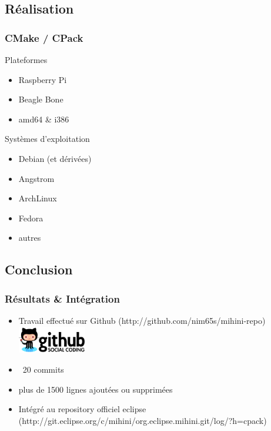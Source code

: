 \documentclass[slidetop,11pt]{beamer}
\begin{document}
\subsection{Réalisation} %
\begin{frame}
    \frametitle{CMake / CPack}
    \begin{block}{Plateformes}
        \begin{itemize}
            \item Raspberry Pi
            \item Beagle Bone
            \item amd64 \& i386
        \end{itemize}
    \end{block}
    \begin{block}{Systèmes d’exploitation}
        \begin{itemize}
            \item Debian (et dérivées)
            \item Angstrom
            \item ArchLinux
            \item Fedora
            \item autres
        \end{itemize}
    \end{block}
\end{frame}


\subsection{Conclusion} %
\begin{frame}
    \frametitle{Résultats \& Intégration}
    \begin{itemize}
        \item Travail effectué sur Github (http://github.com/nim65s/mihini-repo)
            \includegraphics[width=3cm]{img/github.png}
        \item ~20 commits
        \item plus de 1500 lignes ajoutées ou supprimées
        \item Intégré au repository officiel eclipse (http://git.eclipse.org/c/mihini/org.eclipse.mihini.git/log/?h=cpack)
    \end{itemize}
\end{frame}
\end{document}
